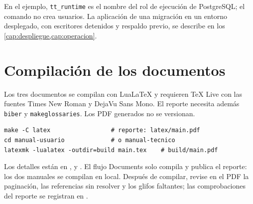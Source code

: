 En el ejemplo, \texttt{tt\_runtime} es el nombre del rol de ejecución de
PostgreSQL; el comando no crea usuarios. La aplicación de una migración en un
entorno desplegado, con escritores detenidos y respaldo previo, se describe
en los \cref{cap:despliegue,cap:operacion}.

\section{Compilación de los documentos}\label{sec:mant-documentos}

Los tres documentos se compilan con LuaLaTeX y requieren TeX Live con las
fuentes Times New Roman y DejaVu Sans Mono. El reporte necesita además
\texttt{biber} y \texttt{makeglossaries}. Los PDF generados no se versionan.

\begin{verbatim}
make -C latex                 # reporte: latex/main.pdf
cd manual-usuario             # o manual-tecnico
latexmk -lualatex -outdir=build main.tex    # build/main.pdf
\end{verbatim}

Los detalles están en ,
 y . El flujo
Documents solo compila y publica el reporte: los dos manuales se compilan en
local. Después de compilar, revise en el PDF la paginación, las referencias
sin resolver y los glifos faltantes; las comprobaciones del reporte se
registran en .
